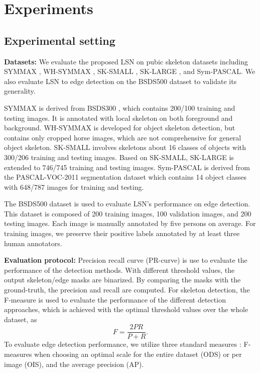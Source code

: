 \documentclass[runningheads]{llncs}
\begin{document}
\section{Experiments}

\subsection{Experimental setting}
\textbf{Datasets:} We evaluate the proposed LSN on pubic skeleton datasets including SYMMAX \cite{ref15}, WH-SYMMAX \cite{ref17}, SK-SMALL \cite{ref7}, SK-LARGE \cite{ref33}, and Sym-PASCAL\cite{ref1}. We also evaluate LSN to edge detection on the BSDS500 dataset \cite{ref35} to validate its generality.

SYMMAX is derived from BSDS300 \cite{ref35}, which contains 200/100 training and testing images. It is annotated with local skeleton on both foreground and background. WH-SYMMAX is developed for object skeleton detection, but contains only cropped horse images, which are not comprehensive for general object skeleton. SK-SMALL involves skeletons about 16 classes of objects with 300/206 training and testing images. Based on SK-SMALL, SK-LARGE is extended to 746/745 training and testing images. Sym-PASCAL is derived from the PASCAL-VOC-2011 segmentation dataset \cite{ref36} which contains 14 object classes with 648/787 images for training and testing. 

The BSDS500 \cite{ref35} dataset is used to evaluate LSN's performance on edge detection. This dataset is composed of 200 training images, 100 validation images, and 200 testing images. Each image is manually annotated by five persons on average. For training images, we preserve their positive labels annotated by at least three human annotators.

\textbf{Evaluation protocol:} Precision recall curve (PR-curve) is use to evaluate the performance of the detection methods. With different threshold values, the output skeleton/edge masks are binarized. By comparing the masks with the ground-truth, the precision and recall are computed. For skeleton detection, the F-measure is used to evaluate the performance of the different detection approaches, which is achieved with the optimal threshold values over the whole dataset, as
\begin{equation}
   F = \frac{{2PR}}{{P + R}}.
\end{equation}
To evaluate edge detection performance, we utilize three standard measures \cite{ref35}: F-measures when choosing an optimal scale for the entire dataset (ODS) or per image (OIS), and the average precision (AP).
\end{document}
